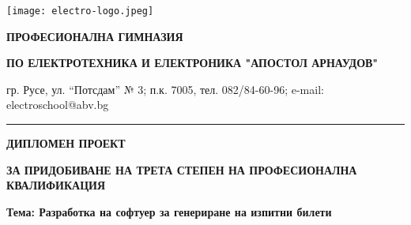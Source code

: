 \addtocounter{page}{-1}

\begin{changemargin}{-2cm}{-2cm}
\setlength{\columnsep}{-16cm}
\begin{multicols}{2}
    \texttt{[image: electro-logo.jpeg]}

    \vfill\null\columnbreak  %

    \begin{center}
        \begin{footnotesize}
        \textbf{ПРОФЕСИОНАЛНА ГИМНАЗИЯ}

        \textbf{ПО ЕЛЕКТРОТЕХНИКА И ЕЛЕКТРОНИКА "АПОСТОЛ АРНАУДОВ"}

        гр. Русе, ул. “Потсдам” № 3; п.к. 7005, тел. 082/84-60-96;  e-mail:  electroschool@abv.bg
        \end{footnotesize}
    \end{center}

\end{multicols}
\end{changemargin}

\begin{spacing}{0}
\par\noindent\rule{\textwidth}{0.4pt}
\end{spacing}

\hfill \break
\hfill \break

\begin{center}

\begin{huge}
\textbf{ДИПЛОМЕН ПРОЕКТ}
\end{huge}

\hfill

\begin{small}
\textbf{ЗА ПРИДОБИВАНЕ НА ТРЕТА СТЕПЕН НА ПРОФЕСИОНАЛНА КВАЛИФИКАЦИЯ}
\end{small}

\hfill \break

\hfill \break

\hfill \break

\hfill \break

\hfill \break

\begin{LARGE}
\textbf{Тема: Разработка на софтуер за генериране на изпитни билети}
\end{LARGE}

\end{center}


